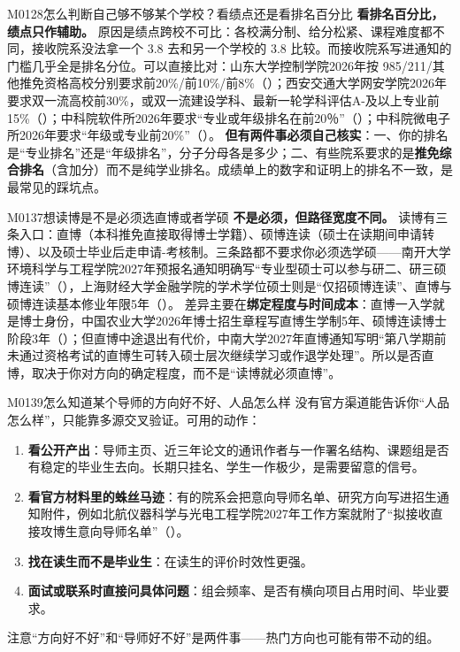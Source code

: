 \begin{qa}{M0128}{怎么判断自己够不够某个学校？看绩点还是看排名百分比}
\textbf{看排名百分比，绩点只作辅助。} 原因是绩点跨校不可比：各校满分制、给分松紧、课程难度都不同，接收院系没法拿一个 3.8 去和另一个学校的 3.8 比较。而接收院系写进通知的门槛几乎全是排名分位。可以直接比对：山东大学控制学院2026年按 985/211/其他推免资格高校分别要求前20\%/前10\%/前8\%（）；西安交通大学网安学院2026年要求双一流高校前30\%，或双一流建设学科、最新一轮学科评估A-及以上专业前15\%（）；中科院软件所2026年要求“专业或年级排名在前20％”（）；中科院微电子所2026年要求“年级或专业前20\%”（）。
\textbf{但有两件事必须自己核实}：一、你的排名是“专业排名”还是“年级排名”，分子分母各是多少；二、有些院系要求的是\textbf{推免综合排名}（含加分）而不是纯学业排名。成绩单上的数字和证明上的排名不一致，是最常见的踩坑点。
\end{qa}

\begin{qa}{M0137}{想读博是不是必须选直博或者学硕}
\textbf{不是必须，但路径宽度不同。} 读博有三条入口：直博（本科推免直接取得博士学籍）、硕博连读（硕士在读期间申请转博）、以及硕士毕业后走申请-考核制。三条路都不要求你必须选学硕——南开大学环境科学与工程学院2027年预报名通知明确写“专业型硕士可以参与研二、研三硕博连读”（），上海财经大学金融学院的学术学位硕士则是“仅招硕博连读”、直博与硕博连读基本修业年限5年（）。
差异主要在\textbf{绑定程度与时间成本}：直博一入学就是博士身份，中国农业大学2026年博士招生章程写直博生学制5年、硕博连读博士阶段3年（）；但直博中途退出有代价，中南大学2027年直博通知写明“第八学期前未通过资格考试的直博生可转入硕士层次继续学习或作退学处理”。所以是否直博，取决于你对方向的确定程度，而不是“读博就必须直博”。
\end{qa}

\begin{qa}{M0139}{怎么知道某个导师的方向好不好、人品怎么样}
没有官方渠道能告诉你“人品怎么样”，只能靠多源交叉验证。可用的动作：
\begin{enumerate}
  \item \textbf{看公开产出}：导师主页、近三年论文的通讯作者与一作署名结构、课题组是否有稳定的毕业生去向。长期只挂名、学生一作极少，是需要留意的信号。
  \item \textbf{看官方材料里的蛛丝马迹}：有的院系会把意向导师名单、研究方向写进招生通知附件，例如北航仪器科学与光电工程学院2027年工作方案就附了“拟接收直接攻博生意向导师名单”（）。
  \item \textbf{找在读生而不是毕业生}：在读生的评价时效性更强。
  \item \textbf{面试或联系时直接问具体问题}：组会频率、是否有横向项目占用时间、毕业要求。
\end{enumerate}
注意“方向好不好”和“导师好不好”是两件事——热门方向也可能有带不动的组。
\end{qa}

